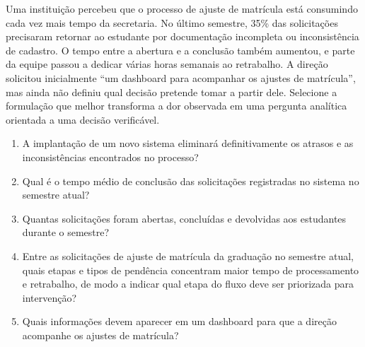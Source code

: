 \documentclass[12pt,a4paper]{article}
\begin{document}
\TextoBase
Uma instituição percebeu que o processo de ajuste de matrícula está consumindo cada vez mais tempo da secretaria. No último semestre, 35\% das solicitações precisaram retornar ao estudante por documentação incompleta ou inconsistência de cadastro. O tempo entre a abertura e a conclusão também aumentou, e parte da equipe passou a dedicar várias horas semanais ao retrabalho. A direção solicitou inicialmente ``um dashboard para acompanhar os ajustes de matrícula'', mas ainda não definiu qual decisão pretende tomar a partir dele.
\FonteDidatica
\Comando Selecione a formulação que melhor transforma a dor observada em uma pergunta analítica orientada a uma decisão verificável.
\begin{enumerate}[label=\Alph*)]
\item A implantação de um novo sistema eliminará definitivamente os atrasos e as inconsistências encontrados no processo?
\item Qual é o tempo médio de conclusão das solicitações registradas no sistema no semestre atual?
\item Quantas solicitações foram abertas, concluídas e devolvidas aos estudantes durante o semestre?
\item Entre as solicitações de ajuste de matrícula da graduação no semestre atual, quais etapas e tipos de pendência concentram maior tempo de processamento e retrabalho, de modo a indicar qual etapa do fluxo deve ser priorizada para intervenção?
\item Quais informações devem aparecer em um dashboard para que a direção acompanhe os ajustes de matrícula?
\end{enumerate}
\end{document}
